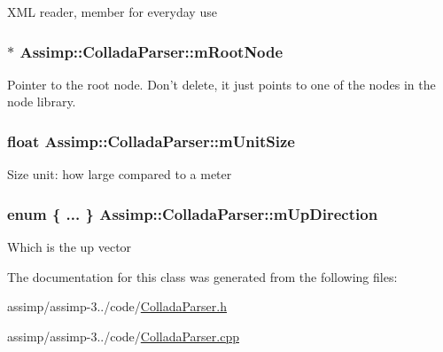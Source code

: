 X\+M\+L reader, member for everyday use \hypertarget{class_assimp_1_1_collada_parser_aaa1d9b95575cdc3312544f22e38ba497}{
\subsubsection[{m\+Root\+Node}]{$\ast$ Assimp\+::\+Collada\+Parser\+::m\+Root\+Node\hspace{0.3cm}{\ttfamily [protected]}}}\label{class_assimp_1_1_collada_parser_aaa1d9b95575cdc3312544f22e38ba497}
Pointer to the root node. Don't delete, it just points to one of the nodes in the node library. \hypertarget{class_assimp_1_1_collada_parser_a5fb8bcd2987a267f75ad6a545b664fea}{
\subsubsection[{m\+Unit\+Size}]{\setlength{\rightskip}{0pt plus 5cm}float Assimp\+::\+Collada\+Parser\+::m\+Unit\+Size\hspace{0.3cm}{\ttfamily [protected]}}}\label{class_assimp_1_1_collada_parser_a5fb8bcd2987a267f75ad6a545b664fea}
Size unit\+: how large compared to a meter \hypertarget{class_assimp_1_1_collada_parser_a485cfd9e616deb9dfbc64095543aecf3}{
\subsubsection[{m\+Up\+Direction}]{\setlength{\rightskip}{0pt plus 5cm}enum \{ ... \}   Assimp\+::\+Collada\+Parser\+::m\+Up\+Direction\hspace{0.3cm}{\ttfamily [protected]}}}\label{class_assimp_1_1_collada_parser_a485cfd9e616deb9dfbc64095543aecf3}
Which is the up vector 

The documentation for this class was generated from the following files\+:\begin{DoxyCompactItemize}
\item 
assimp/assimp-\/3../code/\hyperlink{_collada_parser_8h}{Collada\+Parser.\+h}\item 
assimp/assimp-\/3../code/\hyperlink{_collada_parser_8cpp}{Collada\+Parser.\+cpp}\end{DoxyCompactItemize}
